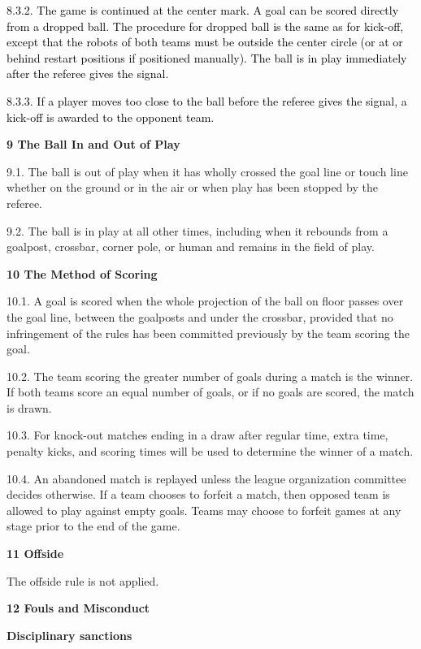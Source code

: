 \documentclass[a4paper]{article}
\begin{document}
\textcolor{black}{8.3.2. The game is continued at the center mark. A goal can be scored directly from a dropped ball.
The procedure for dropped ball is the same as for kick-off, except that the robots of both teams must be outside the
center circle (or at or behind restart positions if positioned manually). The ball is in play immediately after the
referee gives the signal.}

\textcolor{black}{8.3.3. If a player moves too close to the ball before the referee gives the signal, a kick-off is
awarded to the opponent team.}


\bigskip

\textbf{9 The Ball In and Out of Play}

9.1. The ball is out of play when it has wholly crossed the goal line or touch line whether on the ground or in the air
or when play has been stopped by the referee.

9.2. The ball is in play at all other times, including when it rebounds from a goalpost, crossbar, corner pole, or human
and remains in the field of play.

\textbf{10 The Method of Scoring}

10.1. A goal is scored when the whole projection of the ball on floor passes over the goal line, between the goalposts
and under the crossbar, provided that no infringement of the rules has been committed previously by the team scoring
the goal.

10.2. The team scoring the greater number of goals during a match is the winner. If both teams score an equal number of
goals, or if no goals are scored, the match is drawn.

10.3. For knock-out matches ending in a draw after regular time, extra time, penalty kicks, and scoring times will be
used to determine the winner of a match.

10.4. An abandoned match is replayed unless the league organization committee decides otherwise. If a team chooses to
forfeit a match, then opposed team is allowed to play against empty goals. Teams may choose to forfeit games at any
stage prior to the end of the game.


\bigskip

\textbf{11 Offside}

The offside rule is not applied.

\bigskip

\textbf{12 Fouls and Misconduct}

\bigskip

{\bfseries Disciplinary sanctions}
\end{document}
